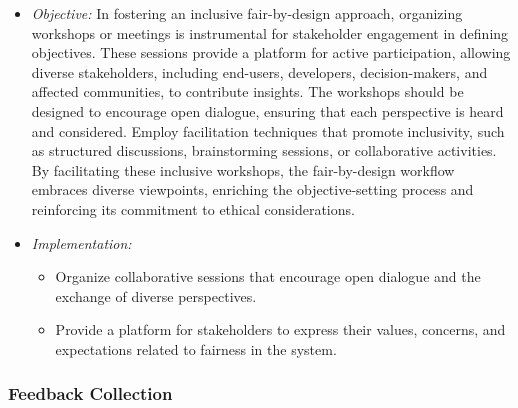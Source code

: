 \documentclass[12pt,a4paper,openright,twoside]{book}
\begin{document}
\begin{itemize}

    \item \emph{Objective:} In fostering an inclusive fair-by-design approach, organizing workshops or meetings is instrumental for stakeholder engagement in defining objectives. These sessions provide a platform for active participation, allowing diverse stakeholders, including end-users, developers, decision-makers, and affected communities, to contribute insights. The workshops should be designed to encourage open dialogue, ensuring that each perspective is heard and considered. Employ facilitation techniques that promote inclusivity, such as structured discussions, brainstorming sessions, or collaborative activities. By facilitating these inclusive workshops, the fair-by-design workflow embraces diverse viewpoints, enriching the objective-setting process and reinforcing its commitment to ethical considerations.

    \item \emph{Implementation:}

    \begin{itemize}

        \item Organize collaborative sessions that encourage open dialogue and the exchange of diverse perspectives.

        \item Provide a platform for stakeholders to express their values, concerns, and expectations related to fairness in the system.

    \end{itemize}

\end{itemize}

\subsubsection{Feedback Collection}
\end{document}
